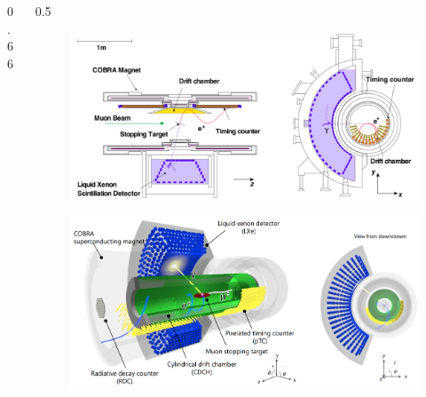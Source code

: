 \documentclass{beamer}
\begin{document}
\begin{frame}
\begin{columns}
\begin{column}{0.66\framewidth}
\begin{itemize}
\begin{itemize}
{                }
                \end{itemize}
    \end{itemize}
    \end{column}
    \begin{column}{0.5\framewidth}
        \begin{figure}[!h]
            \centering
            \includegraphics[width =\columnwidth]{figures/png/Screenshot_20240321_115127.png}
            \end{figure}
            \begin{figure}[!h]
                \centering
                \includegraphics[width =\columnwidth]{figures/png/Screenshot_20240307_140116.png}
                \end{figure}
    \end{column}

\end{columns}
    \end{frame}
  
\end{document}
